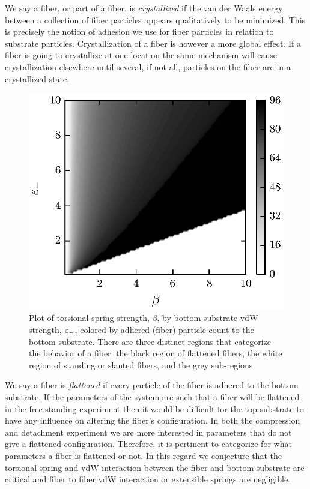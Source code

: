 We say a fiber, or part of a fiber, is \textit{crystallized} if the van der Waals energy between a collection of fiber particles appears qualitatively to be minimized. This is precisely the notion of adhesion we use for fiber particles in relation to substrate particles. Crystallization of a fiber is however a more global effect. If a fiber is going to crystallize at one location the same mechanism will cause crystallization elsewhere until several, if not all, particles on the fiber are in a crystallized state. 

	\begin{figure}[ht!]
		\begin{center}
			\includegraphics{./fig/ch3/fs/grid.eps}
		\end{center}		
		\caption{Plot of torsional spring strength, $\beta$, by bottom substrate vdW strength, $\varepsilon_-$, colored by adhered (fiber) particle count to the bottom substrate. There are three distinct regions that categorize the behavior of a fiber: the black region of flattened fibers, the white region of standing or slanted fibers, and the grey sub-regions.
		\label{fig:fs}}
	\end{figure}

We say a fiber is \textit{flattened} if every particle of the fiber is adhered to the bottom substrate. If the parameters of the system are such that a fiber will be flattened in the free standing experiment then it would be difficult for the top substrate to have any influence on altering the fiber's configuration. In both the compression and detachment experiment we are more interested in parameters that do not give a flattened configuration. Therefore, it is pertinent to categorize for what parameters a fiber is flattened or not. In this regard we conjecture that the torsional spring and vdW interaction between the fiber and bottom substrate are critical and fiber to fiber vdW interaction or extensible springs are negligible.


